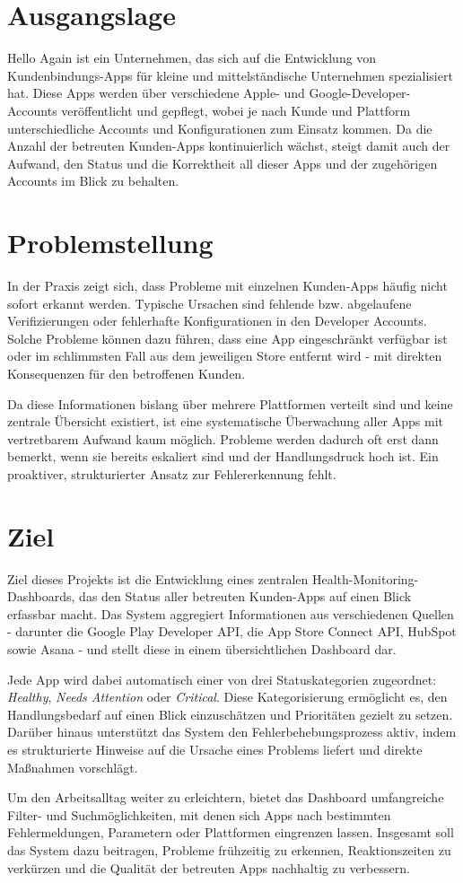 \section{Ausgangslage}
Hello Again ist ein Unternehmen, das sich auf die Entwicklung von Kundenbindungs-Apps für kleine und mittelständische Unternehmen spezialisiert hat. Diese Apps werden über verschiedene Apple- und Google-Developer-Accounts veröffentlicht und gepflegt, wobei je nach Kunde und Plattform unterschiedliche Accounts und Konfigurationen zum Einsatz kommen. Da die Anzahl der betreuten Kunden-Apps kontinuierlich wächst, steigt damit auch der Aufwand, den Status und die Korrektheit all dieser Apps und der zugehörigen Accounts im Blick zu behalten.

\section{Problemstellung}
In der Praxis zeigt sich, dass Probleme mit einzelnen Kunden-Apps häufig nicht sofort erkannt werden. Typische Ursachen sind fehlende bzw. abgelaufene Verifizierungen oder fehlerhafte Konfigurationen in den Developer Accounts. Solche Probleme können dazu führen, dass eine App eingeschränkt verfügbar ist oder im schlimmsten Fall aus dem jeweiligen Store entfernt wird - mit direkten Konsequenzen für den betroffenen Kunden.

Da diese Informationen bislang über mehrere Plattformen verteilt sind und keine zentrale Übersicht existiert, ist eine systematische Überwachung aller Apps mit vertretbarem Aufwand kaum möglich. Probleme werden dadurch oft erst dann bemerkt, wenn sie bereits eskaliert sind und der Handlungsdruck hoch ist. Ein proaktiver, strukturierter Ansatz zur Fehlererkennung fehlt.

\section{Ziel}
Ziel dieses Projekts ist die Entwicklung eines zentralen Health-Monitoring-Dashboards, das den Status aller betreuten Kunden-Apps auf einen Blick erfassbar macht. Das System aggregiert Informationen aus verschiedenen Quellen - darunter die Google Play Developer API, die App Store Connect API, HubSpot sowie Asana - und stellt diese in einem übersichtlichen Dashboard dar.

Jede App wird dabei automatisch einer von drei Statuskategorien zugeordnet: \textit{Healthy}, \textit{Needs Attention} oder \textit{Critical}. Diese Kategorisierung ermöglicht es, den Handlungsbedarf auf einen Blick einzuschätzen und Prioritäten gezielt zu setzen. Darüber hinaus unterstützt das System den Fehlerbehebungsprozess aktiv, indem es strukturierte Hinweise auf die Ursache eines Problems liefert und direkte Maßnahmen vorschlägt.

Um den Arbeitsalltag weiter zu erleichtern, bietet das Dashboard umfangreiche Filter- und Suchmöglichkeiten, mit denen sich Apps nach bestimmten Fehlermeldungen, Parametern oder Plattformen eingrenzen lassen. Insgesamt soll das System dazu beitragen, Probleme frühzeitig zu erkennen, Reaktionszeiten zu verkürzen und die Qualität der betreuten Apps nachhaltig zu verbessern.